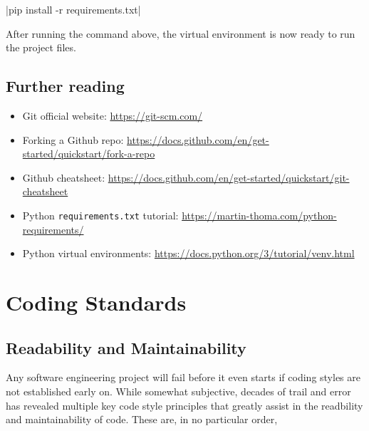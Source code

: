 \documentclass[11pt]{article}
\begin{document}
|pip install -r requirements.txt|

\noindent
After running the command above, the virtual environment is now ready to run the project files.

\subsection{Further reading}

\begin{itemize}
    \item Git official website: \url{https://git-scm.com/}
    \item Forking a Github repo: \url{https://docs.github.com/en/get-started/quickstart/fork-a-repo}
    \item Github cheatsheet: \url{https://docs.github.com/en/get-started/quickstart/git-cheatsheet}
    \item Python \texttt{requirements.txt} tutorial: \url{https://martin-thoma.com/python-requirements/}
    \item Python virtual environments: \url{https://docs.python.org/3/tutorial/venv.html}
\end{itemize}

\newpage

\section{Coding Standards}

\subsection{Readability and Maintainability}

Any software engineering project will fail before it even starts if coding styles are not established early on. While somewhat subjective, decades of trail and error has revealed multiple key code style principles that greatly assist in the readbility and maintainability of code. These are, in no particular order,
\end{document}
